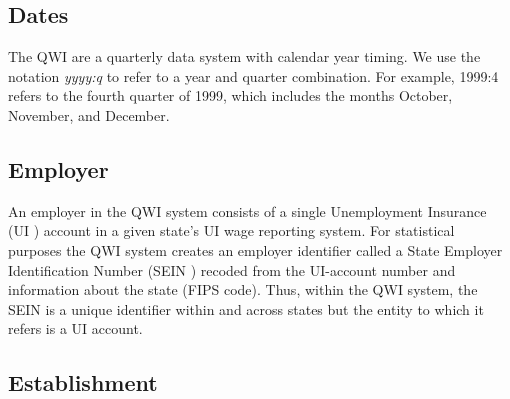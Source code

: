                       


%
%


\subsection{Dates}


The QWI are a quarterly data system with calendar year timing. We use the
notation \textit{yyyy:q} to refer to a year and quarter combination. For
example, 1999:4 refers to the fourth quarter of 1999, which includes the
months October, November, and December.

\subsection{Employer}


An employer in the QWI system consists of a single Unemployment Insurance (UI%
) account in a given state's UI wage reporting system. For
statistical purposes the QWI system creates an employer identifier called a
State Employer Identification Number (SEIN%
) recoded from the UI-account number and information about the
state (FIPS%
 code). Thus, within the QWI system, the SEIN is a unique
identifier within and across states but the entity to which it refers is a
UI account.

\subsection{Establishment}


